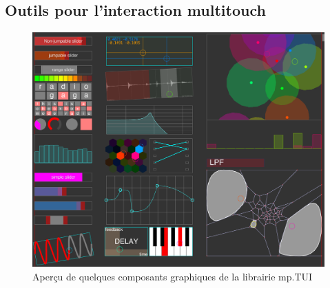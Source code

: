 \subsection{Outils pour l'interaction multitouch}


\begin{figure}[!htbp]
	\includegraphics[width=\textwidth]{gfx/mpTUI/mp-TUI-preview.png}
	\caption{Aperçu de quelques composants graphiques de la librairie mp.TUI}
	\label{fig:visual_representation:mp.TUI}
\end{figure}


